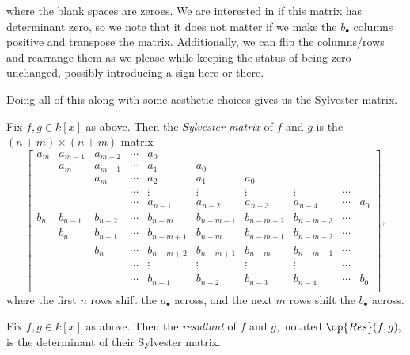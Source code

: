 where the blank spaces are zeroes. We are interested in if this matrix has determinant zero, so we note that it does not matter if we make the $b_\bullet$ columns positive and transpose the matrix. Additionally, we can flip the columns/rows and rearrange them as we please while keeping the status of being zero unchanged, possibly introducing a sign here or there.

Doing all of this along with some aesthetic choices gives us the Sylvester matrix.
\begin{definition}
	Fix $f,g\in k[x]$ as above. Then the \textit{Sylvester matrix} of $f$ and $g$ is the $(n+m)\times(n+m)$ matrix
	\[\begin{bmatrix}
		a_m & a_{m-1} & a_{m-2} & \cdots & a_0       &           &           &           &        &     \\
			& a_m     & a_{m-1} & \cdots & a_1       & a_0       &           &           &        &     \\
			&         & a_m     & \cdots & a_2       & a_1       & a_0       &           &        &     \\
			&         &         & \cdots & \vdots    & \vdots    & \vdots    & \vdots    & \cdots &     \\
			&         &         & \cdots & a_{n-1}   & a_{n-2}   & a_{n-3}   & a_{n-4}   & \cdots & a_0 \\
		b_n & b_{n-1} & b_{n-2} & \cdots & b_{n-m}   & b_{n-m-1} & b_{n-m-2} & b_{n-m-3} & \cdots &     \\
			& b_n     & b_{n-1} & \cdots & b_{n-m+1} & b_{n-m}   & b_{n-m-1} & b_{n-m-2} & \cdots &     \\
			&         & b_n     & \cdots & b_{n-m+2} & b_{n-m+1} & b_{n-m}   & b_{n-m-1} & \cdots &     \\
			&         &         & \cdots & \vdots    & \vdots    & \vdots    & \vdots    & \cdots &     \\
			&         &         & \cdots & b_{n-1}   & b_{n-2}   & b_{n-3}   & b_{n-4}   & \cdots & b_0 \\
	\end{bmatrix},\]
	where the first $n$ rows shift the $a_\bullet$ across, and the next $m$ rows shift the $b_\bullet$ across.
\end{definition}
\begin{definition}[Resultant]
	Fix $f,g\in k[x]$ as above. Then the \textit{resultant} of $f$ and $g,$ notated $\op{Res}(f,g),$ is the determinant of their Sylvester matrix.
\end{definition}
